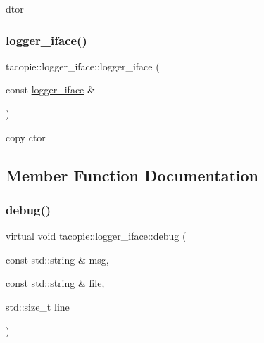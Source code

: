dtor 

\mbox{\label{classtacopie_1_1logger__iface_a34fb7873b2c5e908afd2d4a0d4965ec1}} 
\subsubsection{\texorpdfstring{logger\+\_\+iface()}{logger\_iface()}\hspace{0.1cm}{\footnotesize\ttfamily [2/2]}}
{\footnotesize\ttfamily tacopie\+::logger\+\_\+iface\+::logger\+\_\+iface (\begin{DoxyParamCaption}\item[{const \hyperlink{classtacopie_1_1logger__iface}{logger\+\_\+iface} \&}]{ }\end{DoxyParamCaption})\hspace{0.3cm}{\ttfamily [default]}}



copy ctor 



\subsection{Member Function Documentation}
\mbox{\label{classtacopie_1_1logger__iface_a156abb02ab852ea4033fc13f4902ee7a}} 
\subsubsection{\texorpdfstring{debug()}{debug()}}
{\footnotesize\ttfamily virtual void tacopie\+::logger\+\_\+iface\+::debug (\begin{DoxyParamCaption}\item[{const std\+::string \&}]{msg,  }\item[{const std\+::string \&}]{file,  }\item[{std\+::size\+\_\+t}]{line }\end{DoxyParamCaption})\hspace{0.3cm}{\ttfamily [pure virtual]}}

